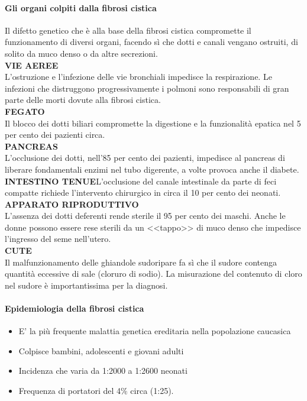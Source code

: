 \documentclass{article}
\begin{document}
\paragraph{Gli organi colpiti dalla fibrosi cistica}
Il difetto genetico che è alla base della fibrosi cistica compromette il funzionamento di diversi organi, facendo sì che
dotti e canali vengano ostruiti, di solito da muco denso o da altre secrezioni.\\
\textbf{VIE AEREE}\\L'ostruzione e l'infezione delle vie bronchiali impedisce la respirazione.
Le infezioni che distruggono progressivamente i polmoni sono responsabili di gran parte delle morti dovute alla fibrosi cistica.\\
\textbf{FEGATO}\\Il blocco dei dotti biliari compromette la digestione e la funzionalità epatica nel 5 per cento dei pazienti circa.\\
\textbf{PANCREAS}\\L'occlusione dei dotti, nell'85 per cento dei pazienti, impedisce al pancreas di liberare fondamentali enzimi nel tubo digerente, a volte provoca anche il diabete.\\
\textbf{INTESTINO TENUE}L'occlusione del canale intestinale da parte di feci compatte richiede l'intervento chirurgico in circa il 10 per cento dei neonati.\\
\textbf{APPARATO RIPRODUTTIVO}\\L'assenza dei dotti deferenti rende sterile il 95 per cento dei maschi. Anche le donne possono essere rese sterili da un <<tappo>> di muco denso che impedisce l'ingresso del seme nell'utero.\\
\textbf{CUTE}\\Il malfunzionamento delle ghiandole sudoripare fa sì che il sudore contenga quantità eccessive di sale (cloruro di sodio). La misurazione del contenuto di cloro nel sudore è importantissima per la diagnosi.
\paragraph{Epidemiologia della fibrosi cistica}
\begin{itemize}
    \item E' la più frequente malattia genetica ereditaria nella popolazione caucasica
    \item Colpisce bambini, adolescenti e giovani adulti
    \item Incidenza che varia da 1:2000 a 1:2600 neonati
    \item Frequenza di portatori del 4$\%$ circa (1:25).
\end{itemize}
\end{document}
